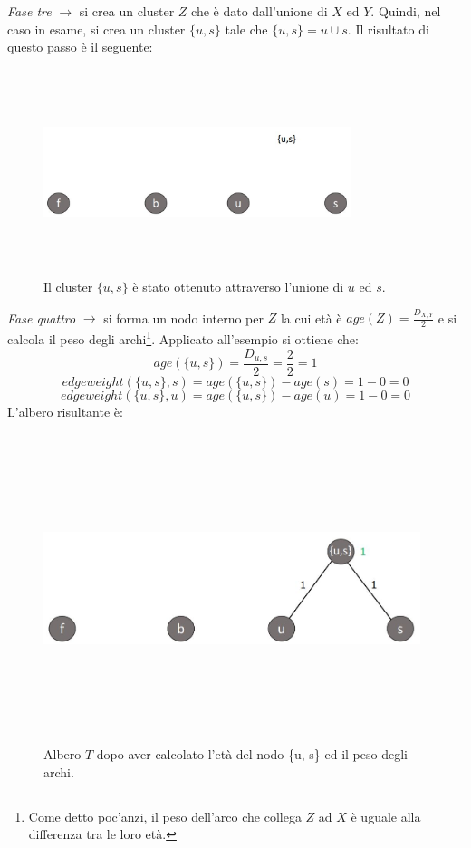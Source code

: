 \newline
\textit{Fase tre} $\rightarrow$ si crea un cluster $Z$ che è dato dall'unione di $X$ ed $Y$. Quindi, nel caso in esame, si crea un cluster $\{u, s\}$ tale che $\{u, s\}=u \cup s$. Il risultato di questo passo è il seguente:
\newpage
\begin{figure}[h!]
\centering
	\includegraphics[height=6cm, width=9cm,keepaspectratio]{rooted_upgma_3.jpg}
 	\caption{Il cluster $\{u, s\}$ è stato ottenuto attraverso l'unione di $u$ ed $s$.}
  	\label{fig:rooted_upgma_3}
\end{figure}
\textit{Fase quattro} $\rightarrow$ si forma un nodo interno per $Z$ la cui età è $age(Z)=\frac{D_{X,Y}}{2}$ e si calcola il peso degli archi\footnote{Come detto poc'anzi, il peso dell'arco che collega $Z$ ad $X$ è uguale alla differenza tra le loro età.}. Applicato all'esempio si ottiene che:
\[age(\{u, s\})=\frac{D_{u,s}}{2}=\frac{2}{2}=1\]
\[edgeweight(\{u, s\},s)=age(\{u, s\})-age(s)=1-0=0\]
\[edgeweight(\{u, s\},u)=age(\{u, s\})-age(u)=1-0=0\]
L'albero risultante è:
\begin{figure}[h!]
\centering
	\includegraphics[height=9cm, width=11cm,keepaspectratio]{rooted_upgma_4.jpg}
 	\caption{Albero $T$ dopo aver calcolato l'età del nodo \{u, s\} ed il peso degli archi.}
  	\label{fig:rooted_upgma_4}
\end{figure}
